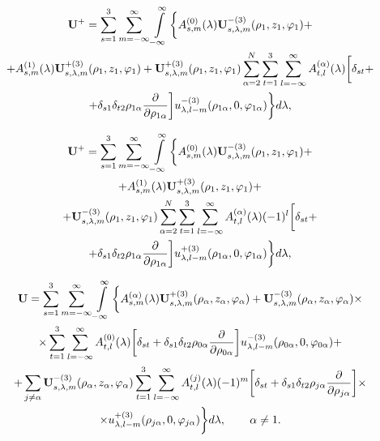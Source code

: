 \begin{russian}
\begin{multline}
{{\bf{U}}^ + } = \sum\limits_{s = 1}^3 {\sum\limits_{m =  - \infty }^\infty  {\int\limits_{ - \infty }^\infty  \bigg\{  } } A_{s,m}^{(0)}(\lambda ){\bf{U}}_{s,\lambda ,m}^{ - (3)}({\rho _1},{z_1},{\varphi _1}) + \\
+ A_{s,m}^{(1)}(\lambda ){\bf{U}}_{s,\lambda ,m}^{ + (3)}({\rho _1},{z_1},{\varphi _1}) + {\bf{U}}_{s,\lambda ,m}^{ + (3)}({\rho _1},{z_1},{\varphi _1})\sum\limits_{\alpha  = 2}^N {\sum\limits_{t = 1}^3 {\sum\limits_{l =  - \infty }^\infty  {A_{t,l}^{(\alpha )}} } } (\lambda )\bigg[{\delta _{st}} + \\
+ {\delta _{s1}}{\delta _{t2}}{\rho _{1\alpha }}\frac{\partial }{{\partial {\rho _{1\alpha }}}}\bigg]u_{\lambda ,l - m}^{ - (3)}({\rho _{1\alpha }},0,{\varphi _{1\alpha }})\bigg\} d\lambda,
\label{eq:7:30}
\end{multline}

\begin{multline}
{{\bf{U}}^ + } = \sum\limits_{s = 1}^3 {\sum\limits_{m =  - \infty }^\infty  {\int\limits_{ - \infty }^\infty  \bigg\{  } } A_{s,m}^{(0)}(\lambda ){\bf{U}}_{s,\lambda ,m}^{ - (3)}({\rho _1},{z_1},{\varphi _1}) + \\
+ A_{s,m}^{(1)}(\lambda ){\bf{U}}_{s,\lambda ,m}^{ + (3)}({\rho _1},{z_1},{\varphi _1}) + \\
+ {\bf{U}}_{s,\lambda ,m}^{ - (3)}({\rho _1},{z_1},{\varphi _1})\sum\limits_{\alpha  = 2}^N {\sum\limits_{t = 1}^3 {\sum\limits_{l =  - \infty }^\infty  {A_{t,l}^{(\alpha )}} } } (\lambda ){( - 1)^l}\bigg[{\delta _{st}} + \\
+ {\delta _{s1}}{\delta _{t2}}{\rho _{1\alpha }}\frac{\partial }{{\partial {\rho _{1\alpha }}}}\bigg]u_{\lambda ,l - m}^{ + (3)}({\rho _{1\alpha }},0,{\varphi _{1\alpha }})\bigg\} d\lambda,
\label{eq:7:31}
\end{multline}

\begin{multline}
{\bf{U}} = \sum\limits_{s = 1}^3 {\sum\limits_{m =  - \infty }^\infty  {\int\limits_{ - \infty }^\infty  \bigg\{  } } A_{s,m}^{(\alpha )}(\lambda ){\bf{U}}_{s,\lambda ,m}^{ + (3)}({\rho _\alpha },{z_\alpha },{\varphi _\alpha }) + {\bf{U}}_{s,\lambda ,m}^{ - (3)}({\rho _\alpha },{z_\alpha },{\varphi _\alpha }) \times \\
\times \sum\limits_{t = 1}^3 {\sum\limits_{l =  - \infty }^\infty  {A_{t,l}^{(0)}} } (\lambda )\bigg[{\delta _{st}} + {\delta _{s1}}{\delta _{t2}}{\rho _{0\alpha }}\frac{\partial }{{\partial {\rho _{0\alpha }}}}\bigg]u_{\lambda ,l - m}^{ - (3)}({\rho _{0\alpha }},0,{\varphi _{0\alpha }}) + \\
+ \sum\limits_{j \ne \alpha } {{\bf{U}}_{s,\lambda ,m}^{ - (3)}} ({\rho _\alpha },{z_\alpha },{\varphi _\alpha })\sum\limits_{t = 1}^3 {\sum\limits_{l =  - \infty }^\infty  {A_{t,l}^{(j)}} } (\lambda ){( - 1)^m}\bigg[{\delta _{st}} + {\delta _{s1}}{\delta _{t2}}{\rho _{j\alpha }}\frac{\partial }{{\partial {\rho _{j\alpha }}}}\bigg] \times \\
\times u_{\lambda ,l - m}^{ + (3)}({\rho _{j\alpha }},0,{\varphi _{j\alpha }})\bigg\} d\lambda ,\qquad {\kern 1pt} \alpha  \ne 1.
\label{eq:7:32}
\end{multline}


\end{russian}
